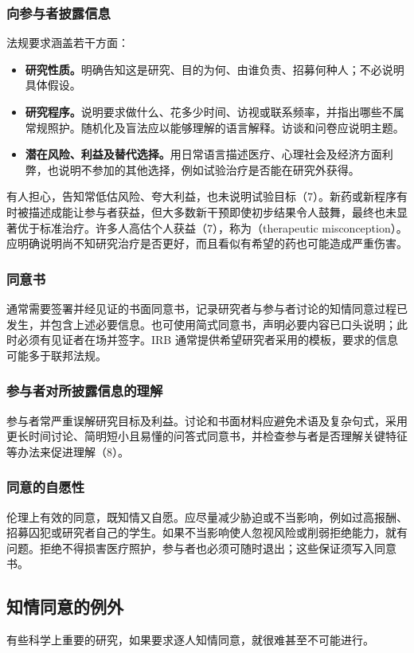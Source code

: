 \subsubsection{向参与者披露信息}
法规要求涵盖若干方面：
\begin{itemize}
\item \textbf{研究性质。}明确告知这是研究、目的为何、由谁负责、招募何种人；不必说明具体假设。
\item \textbf{研究程序。}说明要求做什么、花多少时间、访视或联系频率，并指出哪些不属常规照护。随机化及盲法应以能够理解的语言解释。访谈和问卷应说明主题。
\item \textbf{潜在风险、利益及替代选择。}用日常语言描述医疗、心理社会及经济方面利弊，也说明不参加的其他选择，例如试验治疗是否能在研究外获得。
\end{itemize}
有人担心，告知常低估风险、夸大利益，也未说明试验目标（7）。新药或新程序有时被描述成能让参与者获益，但大多数新干预即使初步结果令人鼓舞，最终也未显著优于标准治疗。许多人高估个人获益（7），称为（therapeutic misconception）。应明确说明尚不知研究治疗是否更好，而且看似有希望的药也可能造成严重伤害。

\subsubsection{同意书}
通常需要签署并经见证的书面同意书，记录研究者与参与者讨论的知情同意过程已发生，并包含上述必要信息。也可使用简式同意书，声明必要内容已口头说明；此时必须有见证者在场并签字。IRB 通常提供希望研究者采用的模板，要求的信息可能多于联邦法规。

\subsubsection{参与者对所披露信息的理解}
参与者常严重误解研究目标及利益。讨论和书面材料应避免术语及复杂句式，采用更长时间讨论、简明短小且易懂的问答式同意书，并检查参与者是否理解关键特征等办法来促进理解（8）。

\subsubsection{同意的自愿性}
伦理上有效的同意，既知情又自愿。应尽量减少胁迫或不当影响，例如过高报酬、招募囚犯或研究者自己的学生。如果不当影响使人忽视风险或削弱拒绝能力，就有问题。拒绝不得损害医疗照护，参与者也必须可随时退出；这些保证须写入同意书。

\subsection{知情同意的例外}
有些科学上重要的研究，如果要求逐人知情同意，就很难甚至不可能进行。
